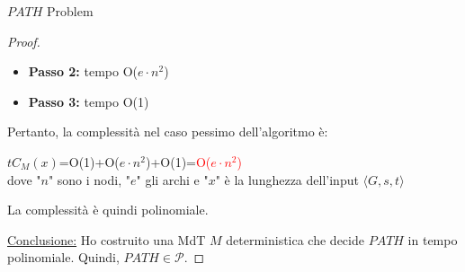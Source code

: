 \documentclass{article}  %
\theoremstyle{definition}
\begin{document}
\begin{theorem}{$PATH$ Problem}
\begin{proof}
\begin{enumerate}
\begin{itemize}
				      \item \textbf{Passo 2:} tempo O($e \cdot n^2$)
				      \item \textbf{Passo 3:} tempo O(1)
			      \end{itemize}
			      Pertanto, la complessità nel caso pessimo dell'algoritmo è:
			      \begin{center}
				      $tC_M(x)$=O(1)+O($e \cdot n^2$)+O(1)=\textcolor{red}{O($e \cdot n^2$)} \\ dove "$n$" sono i nodi, "$e$" gli archi e "$x$" è la lunghezza dell'input $\langle G, s, t \rangle$
			      \end{center}
			      La complessità è quindi polinomiale. \\
		\end{enumerate}
		\underline{Conclusione:} Ho costruito una MdT $M$ deterministica che decide $PATH$ in tempo polinomiale. Quindi, $PATH \in \mathcal{P}$.
	\end{proof}
\end{theorem}
\end{document}
